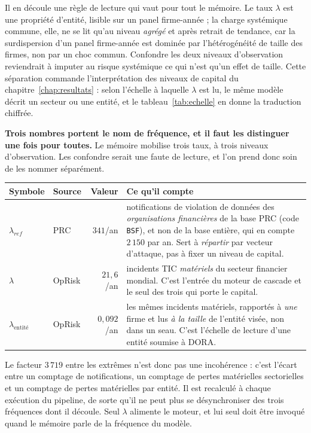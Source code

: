Il en découle une règle de lecture qui vaut pour tout le mémoire. Le taux
$\lambda$ est une propriété d'entité, lisible sur un panel
firme-année ; la charge systémique commune, elle, ne se lit qu'au niveau
\emph{agrégé} et après retrait de tendance, car la surdispersion d'un panel
firme-année est dominée par l'hétérogénéité de taille des firmes, non par un
choc commun. Confondre les deux niveaux d'observation reviendrait à imputer au
risque systémique ce qui n'est qu'un effet de taille. Cette séparation
commande l'interprétation des niveaux de capital du
chapitre~\ref{chap:resultats} : selon l'échelle à laquelle $\lambda$ est lu,
le même modèle décrit un secteur ou une entité, et le
tableau~\ref{tab:echelle} en donne la traduction chiffrée.

\begin{attention}
\textbf{Trois nombres portent le nom de \og{}fréquence\fg{}, et il faut les distinguer une
fois pour toutes.} Le mémoire mobilise trois taux, à trois niveaux d'observation. Les
confondre serait une faute de lecture, et l'on prend donc soin de les nommer séparément.
\begin{center}\small
\renewcommand{\arraystretch}{1.3}
\begin{tabular}{@{}l l r p{5.1cm}@{}}
\toprule
\textbf{Symbole} & \textbf{Source} & \textbf{Valeur} & \textbf{Ce qu'il compte} \\
\midrule
$\lambda_{ref}$ & PRC & $341$/an & notifications de violation de données des
\emph{organisations financières} de la base PRC (code \texttt{BSF}), et non de la base
entière, qui en compte $2\,150$ par an. Sert à \emph{répartir} par vecteur d'attaque, pas à
fixer un niveau de capital. \\
$\lambda$ & OpRisk & $21{,}6$/an & incidents TIC \emph{matériels} du secteur
financier mondial. C'est l'entrée du moteur de cascade et le seul des trois qui
porte le capital. \\
$\lambda_{\text{entité}}$ & OpRisk & $0{,}092$/an & les mêmes incidents matériels, rapportés
à \emph{une} firme et lus \emph{à la taille} de l'entité visée, non dans un seau. C'est
l'échelle de lecture d'une entité soumise à DORA. \\
\bottomrule
\end{tabular}
\end{center}
\vspace{2pt}
Le facteur $3\,719$ entre les extrêmes n'est donc pas une incohérence : c'est l'écart entre
un comptage de notifications, un comptage de pertes matérielles sectorielles et un comptage
de pertes matérielles par entité. Il est recalculé à chaque exécution du pipeline, de sorte
qu'il ne peut plus se désynchroniser des trois fréquences dont il découle.
Seul $\lambda$ alimente le
moteur, et lui
seul doit être invoqué quand le mémoire parle de \og{}la fréquence du modèle\fg{}.
\end{attention}

